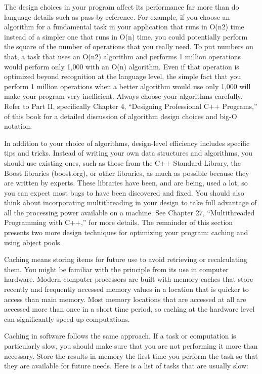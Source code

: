 
The design choices in your program affect its performance far more than do language details such as pass-by-reference. For example, if you choose an algorithm for a fundamental task in your application that runs in O(n2) time instead of a simpler one that runs in O(n) time, you could potentially perform the square of the number of operations that you really need. To put numbers on that, a task that uses an O(n2) algorithm and performs 1 million operations would perform only 1,000 with an O(n) algorithm. Even if that operation is optimized beyond recognition at the language level, the simple fact that you perform 1 million operations when a better algorithm would use only 1,000 will make your program very inefficient. Always choose your algorithms carefully. Refer to Part II, specifically Chapter 4, “Designing Professional C++ Programs,” of this book for a detailed discussion of algorithm design choices and big-O notation.

In addition to your choice of algorithms, design-level efficiency includes specific tips and tricks. Instead of writing your own data structures and algorithms, you should use existing ones, such as those from the C++ Standard Library, the Boost libraries (boost.org), or other libraries, as much as possible because they are written by experts. These libraries have been, and are being, used a lot, so you can expect most bugs to have been discovered and fixed. You should also think about incorporating multithreading in your design to take full advantage of all the processing power available on a machine. See Chapter 27, “Multithreaded Programming with C++,” for more details. The remainder of this section presents two more design techniques for optimizing your program: caching and using object pools.


Caching means storing items for future use to avoid retrieving or recalculating them. You might be familiar with the principle from its use in computer hardware. Modern computer processors are built with memory caches that store recently and frequently accessed memory values in a location that is quicker to access than main memory. Most memory locations that are accessed at all are accessed more than once in a short time period, so caching at the hardware level can significantly speed up computations.

Caching in software follows the same approach. If a task or computation is particularly slow, you should make sure that you are not performing it more than necessary. Store the results in memory the first time you perform the task so that they are available for future needs. Here is a list of tasks that are usually slow:

